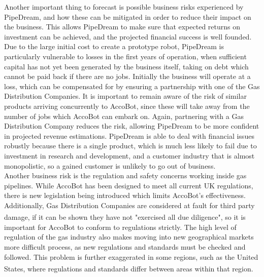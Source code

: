 \documentclass[11pt]{article}		%
\newcommand{\supercite}[1]{\textsuperscript{\cite{#1}}}		%
\begin{document}
 	        \begin{floatingfigure}[r]{0pt} \end{floatingfigure}
	     	Another important thing to forecast is possible business risks experienced by PipeDream, and how these can be mitigated in order to reduce their impact on the business.
	     	This allows PipeDream to make sure that expected returns on investment can be achieved, and the projected financial success is well founded.
	     	\\ 
            \hspace*{2ex}Due to the large initial cost to create a prototype robot, PipeDream is particularly vulnerable to losses in the first years of operation, when sufficient capital has not yet been generated by the business itself, taking on debt which cannot be paid back if there are no jobs.
	     	Initially the business will operate at a loss, which can be compensated for by ensuring a partnership with one of the Gas Distribution Companies.
	     	It is important to remain aware of the risk of similar products arriving concurrently to AccoBot, since these will take away from the number of jobs which AccoBot can embark on.
	     	Again, partnering with a Gas Distribution Company reduces the risk, allowing PipeDream to be more confident in projected revenue estimations.
	     	PipeDream is able to deal with financial issues robustly because there is a single product, which is much less likely to fail due to investment in research and development, and a customer industry that is almost monopolistic, so a gained customer is unlikely to go out of business.
	     	\\ 
            \hspace*{2ex}Another business risk is the regulation and safety concerns working inside gas pipelines.
	     	While AccoBot has been designed to meet all current UK regulations, there is new legislation being introduced which limits AccoBot's effectiveness.
	     	Additionally, Gas Distribution Companies are considered at fault for third party damage, if it can be shown they have not "exercised all due diligence"\supercite{hse1996guide}, so it is important for AccoBot to conform to regulations strictly.
	     	The high level of regulation of the gas industry also makes moving into new geographical markets more difficult process, as new regulations and standards must be checked and followed.
	     	This problem is further exaggerated in some regions, such as the United States, where regulations and standards differ between areas within that region\supercite{pless2011making}.
\end{document}
